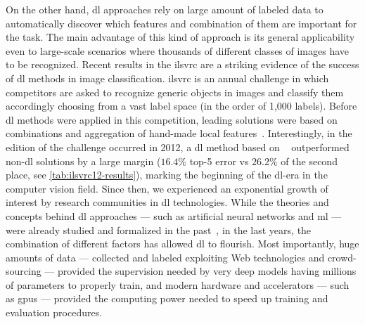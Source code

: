 On the other hand, \acrlong{dl} approaches rely on large amount of labeled data to automatically discover which features and combination of them are important for the task.
The main advantage of this kind of approach is its general applicability even to large-scale scenarios where thousands of different classes of images have to be recognized.
Recent results in the \gls{ilsvrc} are a striking evidence of the success of \gls{dl} methods in image classification.
\gls{ilsvrc} is an annual challenge in which competitors are asked to recognize generic objects in images and classify them accordingly choosing from a vast label space (in the order of 1,000 labels).
Before \gls{dl} methods were applied in this competition, leading solutions were based on combinations and aggregation of hand-made local features~\cite{harada2012graphical,akata2014good,sanchez2011high,mensink2012metric}.
Interestingly, in the edition of the challenge occurred in 2012, a \gls{dl} method based on ~\cite{krizhevsky2012imagenet} outperformed non-\gls{dl} solutions by a large margin ($16.4 \%$ top-5 error vs $26.2 \%$ of the second place, see \ref{tab:ilsvrc12-results}), marking the beginning of the \gls{dl}-era in the computer vision field.
Since then, we experienced an exponential growth of interest by research communities in \gls{dl} technologies.
While the theories and concepts behind \gls{dl} approaches --- such as artificial neural networks and \acrlong{ml} --- were already studied and formalized in the past~\cite{rosenblatt1958perceptron,rumelhart1985learning,lecun1989backpropagation,widrow199030}, in the last years, the combination of different factors has allowed \acrlong{dl} to flourish.
Most importantly, huge amounts of data --- collected and labeled exploiting Web technologies and crowd-sourcing --- provided the supervision needed by very deep models having millions of parameters to properly train, and modern hardware and accelerators --- such as \glspl{gpu} --- provided the computing power needed to speed up training and evaluation procedures.

